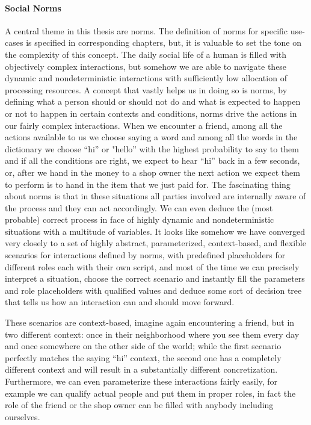 \paragraph{Social Norms}
A central theme in this thesis are norms. The definition of norms for specific use-cases is specified in corresponding chapters, but, it is valuable to set the tone on the complexity of this concept. The daily social life of a human is filled with objectively complex interactions, but somehow we are able to navigate these dynamic and nondeterministic interactions with sufficiently low allocation of processing resources. A concept that vastly helps us in doing so is norms, by defining what a person should or should not do and what is expected to happen or not to happen in certain contexts and conditions, norms drive the actions in our fairly complex interactions. When we encounter a friend, among all the actions available to us we choose saying a word and among all the words in the dictionary we choose ``hi'' or "hello'' with the highest probability to say to them and if all the conditions are right, we expect to hear ``hi'' back in a few seconds, or, after we hand in the money to a shop owner the next action we expect them to perform is to hand in the item that we just paid for. The fascinating thing about norms is that in these situations all parties involved are internally aware of the process and they can act accordingly. We can even deduce the (most probable) correct process in face of highly dynamic and nondeterministic situations with a multitude of variables. It looks like somehow we have converged very closely to a set of highly abstract, parameterized, context-based, and flexible scenarios for interactions defined by norms, with predefined placeholders for different roles each with their own script, and most of the time we can precisely interpret a situation, choose the correct scenario and instantly fill the parameters and role placeholders with qualified values and deduce some sort of decision tree that tells us how an interaction can and should move forward.

These scenarios are context-based, imagine again encountering a friend, but in two different context: once in their neighborhood where you see them every day and once somewhere on the other side of the world; while the first scenario perfectly matches the saying ``hi'' context, the second one has a completely different context and will result in a substantially different concretization. Furthermore, we can even parameterize these interactions fairly easily, for example we can qualify actual people and put them in proper roles, in fact the role of the friend or the shop owner can be filled with anybody including ourselves.

